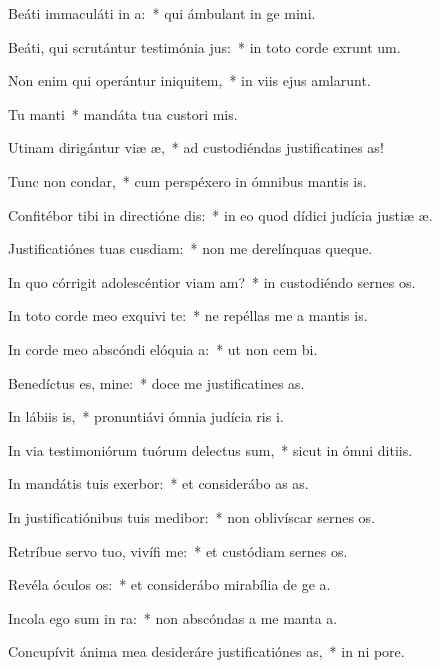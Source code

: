 \item Beáti immaculáti in a:~* qui ámbulant in ge mini.
\item Beáti, qui scrutántur testimónia jus:~* in toto corde exrunt um.
\item Non enim qui operántur iniquitem,~* in viis ejus amlarunt.
\item Tu manti~* mandáta tua custori mis.
\item Utinam dirigántur viæ æ,~* ad custodiéndas justificatines as!
\item Tunc non condar,~* cum perspéxero in ómnibus mantis is.
\item Confitébor tibi in directióne dis:~* in eo quod dídici judícia justiæ æ.
\item Justificatiónes tuas cusdiam:~* non me derelínquas queque.
\item In quo córrigit adolescéntior viam am?~* in custodiéndo sernes os.
\item In toto corde meo exquivi te:~* ne repéllas me a mantis is.
\item In corde meo abscóndi elóquia a:~* ut non cem bi.
\item Benedíctus es, mine:~* doce me justificatines as.
\item In lábiis is,~* pronuntiávi ómnia judícia ris i.
\item In via testimoniórum tuórum delectus sum,~* sicut in ómni ditiis.
\item In mandátis tuis exerbor:~* et considerábo as as.
\item In justificatiónibus tuis medibor:~* non oblivíscar sernes os.
\item Retríbue servo tuo, vivífi me:~* et custódiam sernes os.
\item Revéla óculos os:~* et considerábo mirabília de ge a.
\item Incola ego sum in ra:~* non abscóndas a me manta a.
\item Concupívit ánima mea desideráre justificatiónes as,~* in ni pore.
